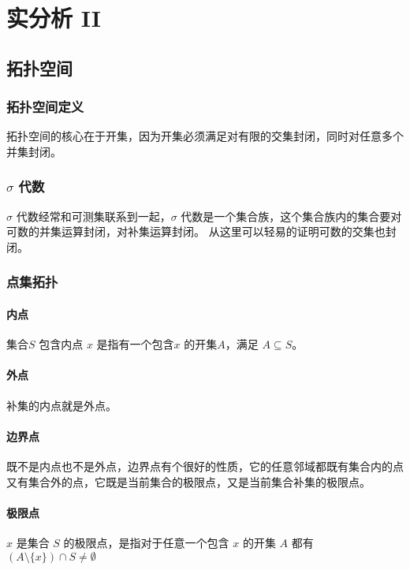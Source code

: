 \chapter{实分析 II}

\section{拓扑空间}

\subsection{拓扑空间定义}

拓扑空间的核心在于开集，因为开集必须满足对有限的交集封闭，同时对任意多个并集封闭。

\subsection{$ \sigma $ 代数}

$\sigma$ 代数经常和可测集联系到一起，$\sigma$ 代数是一个集合族，这个集合族内的集合要对可数的并集运算封闭，对补集运算封闭。
从这里可以轻易的证明可数的交集也封闭。

\subsection{点集拓扑}

\subsubsection{内点}
集合$S$ 包含内点 $x$ 是指有一个包含$x$ 的开集$A$，满足 $A \subseteq S$。

\subsubsection{外点}

补集的内点就是外点。 


\subsubsection{边界点}

既不是内点也不是外点，边界点有个很好的性质，它的任意邻域都既有集合内的点又有集合外的点，它既是当前集合的极限点，又是当前集合补集的极限点。

\subsubsection{极限点}
$x$ 是集合 $S$ 的极限点，是指对于任意一个包含 $x$ 的开集 $A$ 都有 $ (A \setminus \{ x \}) \cap S \ne \emptyset$

